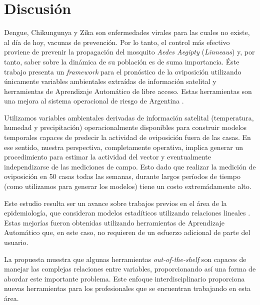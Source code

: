 



\justifying

\chapter{Discusión}

  \par Dengue, Chikungunya y Zika son enfermedades virales para las cuales no
    existe, al día de hoy, vacunas de prevención. Por lo tanto, el control
    más efectivo proviene de prevenir la propagación del mosquito
    \textit{Aedes Aegipty} (\textit{Linneaus}) y, por tanto, saber sobre la
    dinámica de su población es de suma importancia. Éste trabajo presenta un
    \textit{framework} para el pronóstico de la oviposición utilizando
    únicamente variables ambientales extraídas de información satelital y
    herramientas de Aprendizaje Automático de libre acceso. Estas herramientas
    son una mejora al sistema operacional de riesgo de
    Argentina \cite{porcasi_operative}.

  \par Utilizamos variables ambientales derivadas de información satelital
    (temperatura, humedad y precipitación) operacionalmente disponibles para
    construir modelos temporales capaces de predecir la actividad de oviposición
    fuera de las casas. En ese sentido, nuestra perspectiva, completamente operativa,
    implica generar un procedimiento para estimar la actividad del vector
    y eventualmente independizarse de las mediciones de campo. Esto dado
    que realizar la medición de oviposición en 50 casas todas las semanas, durante
    largos períodos de tiempo (como utilizamos para generar los modelos) tiene
    un costo extremádamente alto.


  \par Este estudio resulta ser un avance sobre trabajos previos en el área
    de la epidemiología, que consideran modelos estadíticos utilizando
    relaciones lineales \cite{models_predicting, modis_data, ndwi_erffectiveness}.
    Estas mejorías fueron obtenidas utilizando herramientas de Aprendizaje
    Automático que, en este caso, no requieren de un esfuerzo adicional de
    parte del usuario.

  \par La propuesta muestra que algunas herramientas \textit{out-of-the-shelf}
    son capaces de manejar las complejas relaciones entre variables, proporcionando
    así una forma de abordar este importante problema. Este enfoque interdisciplinario
    proporciona nuevas herramientas para los profesionales que se encuentran
    trabajando en esta área.


